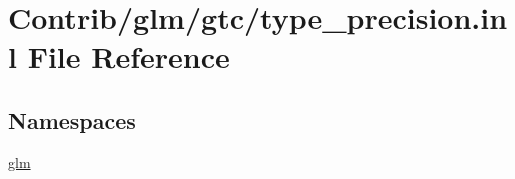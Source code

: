 \hypertarget{type__precision_8inl}{}\section{Contrib/glm/gtc/type\+\_\+precision.inl File Reference}
\label{type__precision_8inl}
\subsection*{Namespaces}
\begin{DoxyCompactItemize}
\item 
 \mbox{\hyperlink{namespaceglm}{glm}}
\end{DoxyCompactItemize}
